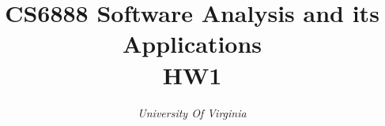 \documentclass[conference]{IEEEtran}
\begin{document}
\title{CS6888 Software Analysis and its Applications \\ HW1\\
}

\author{
\textit{University Of Virginia}\\
}

\maketitle
\end{document}
